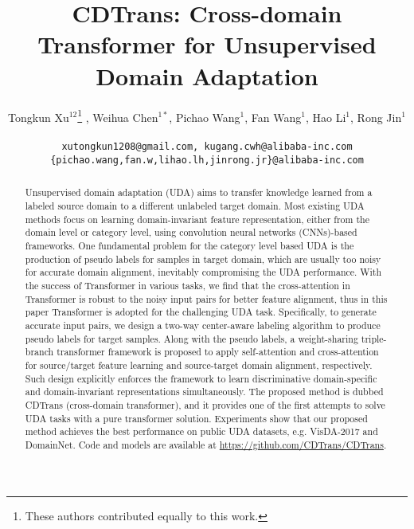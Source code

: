 \documentclass[dvipsnames, svgnames, x11names, table]{article} \usepackage{iclr2022_conference,times}
\title{CDTrans: Cross-domain Transformer for Unsupervised Domain Adaptation}
\author{Tongkun Xu$^{12}$\thanks{These authors contributed equally to this work.} , Weihua Chen$^{1\ast}$, Pichao Wang$^{1}$, Fan Wang$^{1}$, Hao Li$^{1}$, Rong Jin$^{1}$ \\
\text{$^{1}$Alibaba Group, $^{2}$Shandong University} \\
\texttt{xutongkun1208@gmail.com, kugang.cwh@alibaba-inc.com} \\ 
\texttt{\{pichao.wang,fan.w,lihao.lh,jinrong.jr\}@alibaba-inc.com}
}
\begin{document}
\begin{spacing}{1.0}
\maketitle
\vspace{-3mm}
\begin{abstract}
Unsupervised domain adaptation (UDA) aims to transfer knowledge learned from a labeled source domain to a different unlabeled target domain. Most existing UDA methods focus on learning domain-invariant feature representation, either from the domain level or category level, using convolution neural networks (CNNs)-based frameworks. One fundamental problem for the category level based UDA is the production of pseudo labels for samples in target domain, which are usually too noisy for accurate domain alignment, inevitably compromising the UDA performance.  With the success of Transformer in various tasks, we find that the cross-attention in Transformer is robust to the noisy input pairs for better feature alignment, thus in this paper Transformer is adopted for the challenging UDA task. Specifically, to generate accurate input pairs, we design a two-way center-aware labeling algorithm to produce pseudo labels for target samples. Along with the pseudo labels, a weight-sharing triple-branch transformer framework is proposed to apply self-attention and cross-attention for source/target feature learning and source-target domain alignment, respectively. 
Such design explicitly enforces the framework to learn discriminative domain-specific and domain-invariant representations simultaneously. The proposed method is dubbed CDTrans (cross-domain transformer), and it provides one of the first attempts to solve UDA tasks with a pure transformer solution.
Experiments show that our proposed method achieves the best performance on public UDA datasets, e.g. VisDA-2017 and DomainNet. Code and models are available at \url{https://github.com/CDTrans/CDTrans}.
\end{abstract}


\end{spacing}
\end{document}
